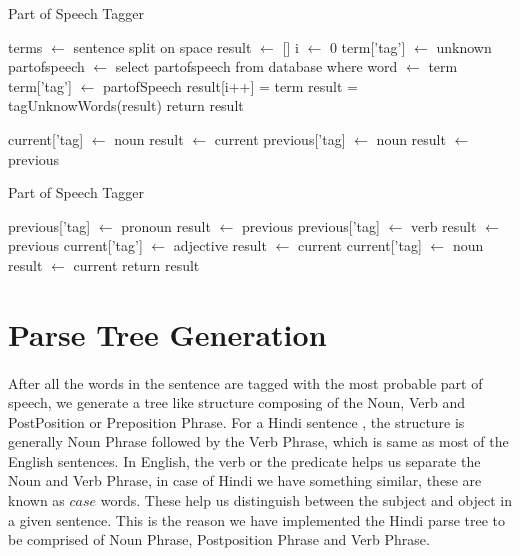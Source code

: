 \begin{algorithm}
\caption{Part of Speech Tagger}\label{alg:brilltaggervariant}
\begin{algorithmic}[1]
\State terms $\gets$ sentence split on space 
\State result $\gets$ []
\State i $\gets$ 0
\State term['tag'] $\gets$ unknown
\State partofspeech $\gets$ select partofspeech from database where word $\gets$ term
\State term['tag'] $\gets$ partofSpeech 
\EndIf
\State result[i++] = term
\EndFor
\State result = tagUnknowWords(result)
\State return result
\EndProcedure

\State current['tag] $\gets$ noun
\State result $\gets$ current
\EndIf
{}
\State previous['tag] $\gets$ noun
\State result $\gets$ previous
\EndIf		
{}		
\end{algorithmic}
\end{algorithm}
\begin{algorithm}
\caption{Part of Speech Tagger}\label{alg:brilltaggervariant}              
\begin{algorithmic}                 
\State previous['tag] $\gets$ pronoun
\State result $\gets$ previous
\EndIf
{}
\State previous['tag] $\gets$ verb
\State result $\gets$ previous
\EndIf
{}
\State current['tag'] $\gets$ adjective
\State result $\gets$ current
\EndIf
{}
\State  current['tag] $\gets$ noun
\State result $\gets$ current
\EndIf
\EndFor
\State return result
\EndProcedure
\end{algorithmic}
\end{algorithm}
\break

\section {Parse Tree Generation}
\paragraph{}
After all the words in the sentence are tagged with the most probable part of speech, we generate a tree like structure composing of the Noun, Verb and PostPosition or Preposition Phrase. For a Hindi sentence \cite{bhat2017improving}, the structure is generally Noun Phrase followed by the Verb Phrase, which is same as most of the English sentences. In English, the verb or the predicate helps us separate the Noun and Verb Phrase, in case of Hindi we have something similar, these are known as $case$ words. These help us distinguish between the subject and object in a given sentence. This is the reason we have implemented the Hindi parse tree to be comprised of Noun Phrase, Postposition Phrase and Verb Phrase. 


